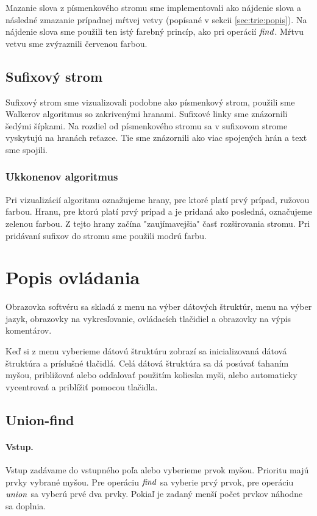 Mazanie slova z písmenkového stromu sme implementovali ako nájdenie slova a 
následné zmazanie prípadnej mŕtvej vetvy (popísané v sekcii 
\ref{sec:trie:popis}). Na nájdenie slova sme použili ten istý farebný princíp, 
ako pri operácií $\mathop{\mathit{find}}$. Mŕtvu vetvu sme zvýraznili červenou farbou.

\subsection{Sufixový strom}

Sufixový strom sme vizualizovali podobne ako písmenkový strom, použili sme 
Walkerov algoritmus \citep{walker} so zakrivenými hranami. Sufixové linky 
sme znázornili šedými šípkami. Na rozdiel od písmenkového stromu sa v 
sufixovom strome vyskytujú na hranách reťazce. Tie sme znázornili ako viac 
spojených hrán a text sme spojili.

\subsubsection{Ukkonenov algoritmus}

Pri vizualizácií algoritmu oznažujeme hrany, pre ktoré platí prvý prípad, 
ružovou farbou. Hranu, pre ktorú platí prvý prípad a je pridaná ako posledná, 
označujeme zelenou farbou. Z tejto hrany začína "zaujímavejšia" časť 
rozširovania stromu. Pri pridávaní sufixov do stromu sme použili modrú farbu.

\section{Popis ovládania}\label{sec:im:im}

Obrazovka softvéru sa skladá z menu na výber dátových štruktúr, menu na výber 
jazyk, obrazovky na vykresľovanie, ovládacích tlačidiel a obrazovky na výpis 
komentárov.

Keď si z menu vyberieme dátovú štruktúru zobrazí sa inicializovaná dátová 
štruktúra a príslušné tlačidlá. Celá dátová štruktúra sa dá posúvať ťahaním 
myšou, približovať alebo odďalovať použitím kolieska myši, alebo automaticky 
vycentrovať a priblížiť pomocou tlačidla.

\subsection{Union-find}

\paragraph{Vstup.} Vstup zadávame do vstupného poľa alebo vyberieme prvok 
myšou. Prioritu majú prvky vybrané myšou. Pre operáciu $\mathop{\mathit{find}}$ sa vyberie prvý 
prvok, pre operáciu $\mathop{\mathit{union}}$ sa vyberú prvé dva prvky. Pokiaľ je zadaný menší 
počet prvkov náhodne sa doplnia. 

